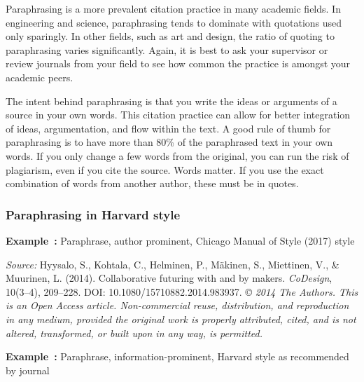 \documentclass[english, 12pt, a4paper, elec, utf8, a-2b, online]{aaltothesis}
\begin{document}
Paraphrasing is a more prevalent citation practice in many academic fields. In 
engineering and science, paraphrasing tends to dominate with quotations used 
only sparingly. In other fields, such as art and design, the ratio of quoting to
paraphrasing varies significantly. Again, it is best to ask your supervisor or 
review journals from your field to see how common the practice is amongst your 
academic peers.

The intent behind paraphrasing is that you write the ideas or arguments of a 
source in your own words. This citation practice can allow for better 
integration of ideas, argumentation, and flow within the text. A good rule of 
thumb for paraphrasing is to have more than 80\% of the paraphrased text in your
own words. If you only change a few words from the original, you can run the 
risk of plagiarism, even if you cite the source. Words matter. If you use the 
exact combination of words from another author, these must be in quotes.


\subsubsection*{Paraphrasing in Harvard style}

\textsf{\textbf{Example~\theexample:}} Paraphrase, author prominent, Chicago 
Manual of Style (2017) style

\vspace{1ex}
\noindent
{}

\vspace{1ex}
\noindent
\textit{Source:} Hyysalo, S., Kohtala, C., Helminen, P., Mäkinen, S., Miettinen,
V., \& Muurinen, L. (2014). Collaborative futuring with and by makers. 
\textit{CoDesign}, 10(3--4), 209--228. DOI: 10.1080/15710882.2014.983937. 
\copyright{}
\textit{2014 The Authors. This is an Open Access article. Non-commercial reuse, 
	distribution, and reproduction in any medium, provided the original work is 
	properly attributed, cited, and is not altered, transformed, or built upon 
	in any way, is permitted.}

\vspace{1em}
\noindent
{}
\textsf{\textbf{Example~\theexample:}} Paraphrase, information-prominent, 
Harvard style as recommended by journal
\end{document}
